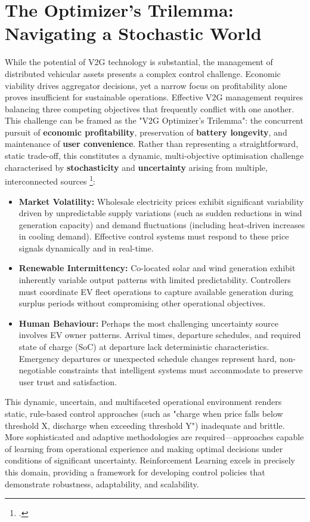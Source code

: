 \section{The Optimizer's Trilemma: Navigating a Stochastic World}

While the potential of V2G technology is substantial, the management of distributed vehicular assets presents a complex control challenge. Economic viability drives aggregator decisions, yet a narrow focus on profitability alone proves insufficient for sustainable operations. Effective V2G management requires balancing three competing objectives that frequently conflict with one another. This challenge can be framed as the "V2G Optimizer's Trilemma": the concurrent pursuit of \textbf{economic profitability}, preservation of \textbf{battery longevity}, and maintenance of \textbf{user convenience}.
\noindent
Rather than representing a straightforward, static trade-off, this constitutes a dynamic, multi-objective optimisation challenge characterised by \textbf{stochasticity} and \textbf{uncertainty} arising from multiple, interconnected sources \footcite{wang2022multi}:

\begin{itemize}
    \item \textbf{Market Volatility:} Wholesale electricity prices exhibit significant variability driven by unpredictable supply variations (such as sudden reductions in wind generation capacity) and demand fluctuations (including heat-driven increases in cooling demand). Effective control systems must respond to these price signals dynamically and in real-time.
    
    \item \textbf{Renewable Intermittency:} Co-located solar and wind generation exhibit inherently variable output patterns with limited predictability. Controllers must coordinate EV fleet operations to capture available generation during surplus periods without compromising other operational objectives.
    
    \item \textbf{Human Behaviour:} Perhaps the most challenging uncertainty source involves EV owner patterns. Arrival times, departure schedules, and required state of charge (SoC) at departure lack deterministic characteristics. Emergency departures or unexpected schedule changes represent hard, non-negotiable constraints that intelligent systems must accommodate to preserve user trust and satisfaction.
\end{itemize}
\noindent
This dynamic, uncertain, and multifaceted operational environment renders static, rule-based control approaches (such as "charge when price falls below threshold X, discharge when exceeding threshold Y") inadequate and brittle. More sophisticated and adaptive methodologies are required—approaches capable of learning from operational experience and making optimal decisions under conditions of significant uncertainty. Reinforcement Learning excels in precisely this domain, providing a framework for developing control policies that demonstrate robustness, adaptability, and scalability.

